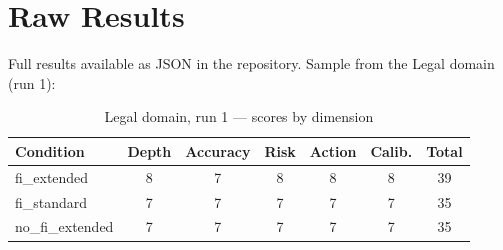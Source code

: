 \documentclass[11pt,a4paper]{article}
\begin{document}
\section{Raw Results}
\label{app:raw}

Full results available as JSON in the repository. Sample from the Legal domain
(run 1):

\begin{table}[h]
\centering
\caption{Legal domain, run 1 — scores by dimension}
\begin{tabular}{lccccc|c}
\toprule
Condition & Depth & Accuracy & Risk & Action & Calib. & Total \\
\midrule
fi\_extended    & 8 & 7 & 8 & 8 & 8 & 39 \\
fi\_standard    & 7 & 7 & 7 & 7 & 7 & 35 \\
no\_fi\_extended & 7 & 7 & 7 & 7 & 7 & 35 \\
\bottomrule
\end{tabular}
\end{table}
\end{document}
